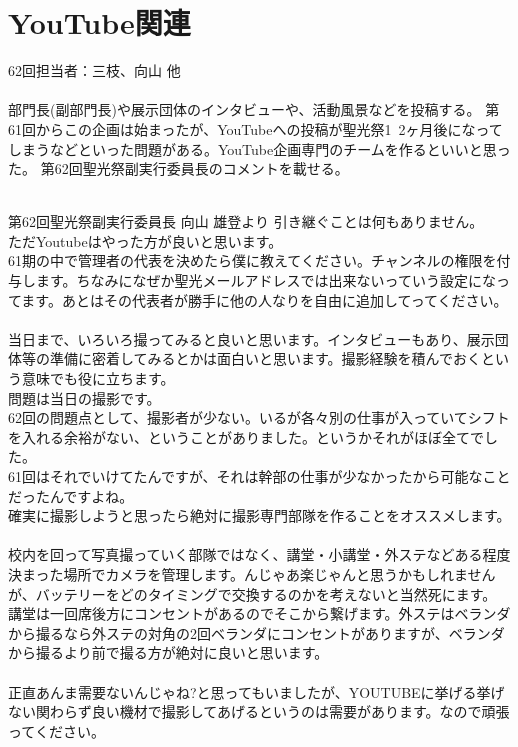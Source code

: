 \documentclass[dvipdfmx,jb5]{jarticle}
\begin{document}
 \section{YouTube関連}
62回担当者：三枝、向山 他
\\
\\
 部門長(副部門長)や展示団体のインタビューや、活動風景などを投稿する。
 第61回からこの企画は始まったが、YouTubeへの投稿が聖光祭1~2ヶ月後になってしまうなどといった問題がある。YouTube企画専門のチームを作るといいと思った。
 第62回聖光祭副実行委員長のコメントを載せる。
 \\
 \\
 \begin{itembox}[l]{第62回聖光祭副実行委員長 向山 雄登より}
 引き継ぐことは何もありません。\\
 ただYoutubeはやった方が良いと思います。\\
 61期の中で管理者の代表を決めたら僕に教えてください。チャンネルの権限を付与します。ちなみになぜか聖光メールアドレスでは出来ないっていう設定になってます。あとはその代表者が勝手に他の人なりを自由に追加してってください。\\\\
当日まで、いろいろ撮ってみると良いと思います。インタビューもあり、展示団体等の準備に密着してみるとかは面白いと思います。撮影経験を積んでおくという意味でも役に立ちます。\\
問題は当日の撮影です。\\
62回の問題点として、撮影者が少ない。いるが各々別の仕事が入っていてシフトを入れる余裕がない、ということがありました。というかそれがほぼ全てでした。\\
61回はそれでいけてたんですが、それは幹部の仕事が少なかったから可能なことだったんですよね。\\
確実に撮影しようと思ったら絶対に撮影専門部隊を作ることをオススメします。\\\\
校内を回って写真撮っていく部隊ではなく、講堂・小講堂・外ステなどある程度決まった場所でカメラを管理します。んじゃあ楽じゃんと思うかもしれませんが、バッテリーをどのタイミングで交換するのかを考えないと当然死にます。\\
講堂は一回席後方にコンセントがあるのでそこから繋げます。外ステはベランダから撮るなら外ステの対角の2回ベランダにコンセントがありますが、ベランダから撮るより前で撮る方が絶対に良いと思います。\\\\
正直あんま需要ないんじゃね?と思ってもいましたが、YOUTUBEに挙げる挙げない関わらず良い機材で撮影してあげるというのは需要があります。なので頑張ってください。
 \end{itembox}
\end{document}
